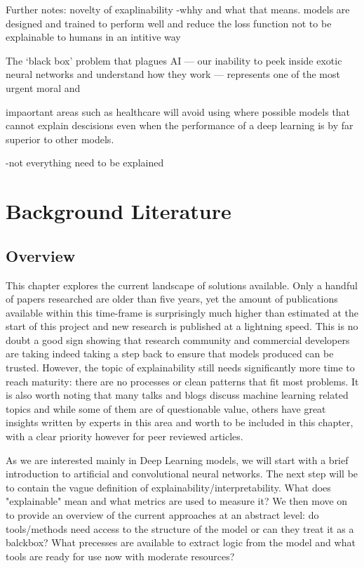 \documentclass[proposal]{softeng}
\begin{document}
Further notes:
novelty of exaplinability -whhy and what that means. models are designed and trained to perform well and reduce the loss function not to be explainable to humans in an intitive way
 
 The ‘black box’ problem that plagues AI — our inability to peek inside exotic neural networks and understand how they work — represents one of the most urgent moral and %

impaortant areas such as healthcare will avoid using where possible models that cannot explain descisions even when the performance of a deep learning is by far superior to other models.


-not everything need to be explained

\newpage
\section{Background Literature}
\subsection{Overview}
This chapter explores the current landscape of solutions available. Only a handful of papers researched are older than five years, yet the amount of publications available within this time-frame is surprisingly much higher than estimated at the start of this project and new research is published at a lightning speed. This is no doubt a good sign showing that research community and commercial developers are taking indeed taking a step back to ensure that models produced can be trusted. However, the topic of explainability still needs significantly more time to reach maturity: there are no processes or clean patterns that fit most problems. It is also worth noting that many talks and blogs discuss machine learning related topics and while some of them are of questionable value, others have great insights written by experts in this area and worth to be included in this chapter, with a clear priority however for peer reviewed articles.

As we are interested mainly in Deep Learning models, we will start with a brief introduction to artificial and convolutional neural networks. The next step will be to contain the vague definition of explainability/interpretability. What does "explainable" mean and what metrics are used to measure it? We then move on to provide an overview of the current approaches at an abstract level: do tools/methods need access to the structure of the model or can they treat it as a balckbox? What precesses are available to extract logic from the model and what tools are ready for use now with moderate resources?
\end{document}
